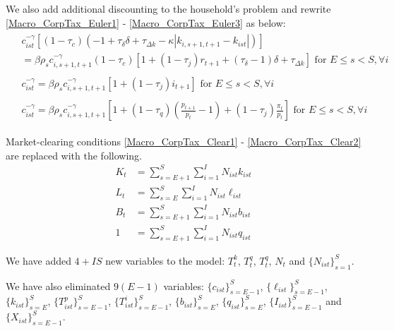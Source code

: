 \documentclass[letterpaper,12pt]{article}
\theoremstyle{definition}
\numberwithin{equation}{section}
\begin{document}
\begin{spacing}{1.5}
    We also add additional discounting to the household's problem and rewrite \eqref{Macro_CorpTax_Euler1} - \eqref{Macro_CorpTax_Euler3} as below:
    \begin{align}
    \begin{split}
    & c_{ist}^{-\gamma}\left[(1-\tau_c)\left(-1+\tau_\delta \delta + \tau_{\Delta k} - \kappa \left|k_{i,s+1,t+1} - k_{ist} \right|\right)\right] \\
    & = \beta \rho_s c_{i,s+1,t+1}^{-\gamma}(1-\tau_c)\left[ 1 + (1-\tau_j)r_{t+1} + (\tau_\delta -1)\delta + \tau_{\Delta k} \right] \text{     for } E\le s<S,\forall i
    \end{split} \label{Macro_Demog_Euler1}\\
    \begin{split}
    & c_{ist}^{-\gamma} = \beta \rho_s c_{i,s+1,t+1}^{-\gamma} \left[ 1+(1-\tau_j)i_{t+1} \right] \text{     for } E\le s<S,\forall i 
    \end{split} \label{Macro_Demog_Euler2}\\
    \begin{split}
    & c_{ist}^{-\gamma} = \beta \rho_s c_{i,s+1,t+1}^{-\gamma}\left[ 1 + (1 - \tau_q)(\tfrac{p_{t+1}}{p_t}-1) + (1-\tau_j)\tfrac{\pi_t}{p_t} \right] \text{     for } E\le s<S,\forall i 
    \end{split} \label{Macro_Demog_Euler3}
    \end{align}

    Market-clearing conditions \eqref{Macro_CorpTax_Clear1} - \eqref{Macro_CorpTax_Clear2} are replaced with the following.
    \begin{align}
    K_t & = \sum_{s=E+1}^S \sum_{i=1}^I N_{ist} k_{ist} \label{Macro_Demog_Clear1}\\
    L_t & = \sum_{s=E}^S \sum_{i=1}^I N_{ist} \ell_{ist} \label{Macro_Demog_Clear2}\\
    B_t & = \sum_{s=E+1}^S \sum_{i=1}^I N_{ist} b_{ist} \label{Macro_Demog_Clear3}\\
    1 & = \sum_{s=E+1}^S \sum_{i=1}^I N_{ist} q_{ist} \label{Macro_Demog_Clear4}
    \end{align}  

    We have added $4 + IS$ new variables to the model: $T^k_t$, $T^q_t$, $T^q_t$, $N_t$ and $\{N_{ist}\}_{s=1}^S$.

    We have also eliminated $9(E-1)$ variables: $\{c_{ist}\}_{s=E-1}^S$, $\{\ell_{ist}\}_{s=E-1}^S$, $\{k_{ist}\}_{s=E}^S$, $\{T^p_{ist}\}_{s=E-1}^S$, $\{T^i_{ist}\}_{s=E-1}^S$, $\{b_{ist}\}_{s=E}^S$, $\{q_{ist}\}_{s=E}^S$, $\{I_{ist}\}_{s=E-1}^S$ and $\{X_{ist}\}_{s=E-1}^S$.


\end{spacing}
\end{document}
